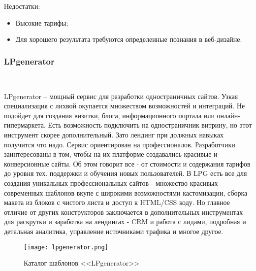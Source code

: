 Недостатки:

\begin{itemize}
	\item Высокие тарифы;
	\item Для хорошего результата требуются определенные познания в веб-дизайне.
\end{itemize}

\subsubsection{LPgenerator}
\

LPgenerator – мощный сервис для разработки одностраничных сайтов. Узкая специализация с лихвой окупается множеством возможностей и интеграций. Не подойдет для создания визитки, блога, информационного портала или онлайн-гипермаркета. Есть возможность подключить на одностраничник витрину, но этот инструмент скорее дополнительный. Зато лендинг при должных навыках получится что надо. 
Сервис ориентирован на профессионалов. Разработчики заинтересованы в том, чтобы на их платформе создавались красивые и конверсионные сайты. Об этом говорит все - от стоимости и содержания тарифов до уровня тех. поддержки и обучения новых пользователей. В LPG есть все для создания уникальных профессиональных сайтов - множество красивых современных шаблонов вкупе с широкими возможностями кастомизации, сборка макета из блоков с чистого листа и доступ к HTML/CSS коду. Но главное отличие от других конструкторов заключается в дополнительных инструментах для раскрутки и заработка на лендингах - CRM и работа с лидами, подробная и детальная аналитика, управление источниками трафика и многое другое.

\begin{figure}
\centering
	\texttt{[image: lpgenerator.png]}
	\caption{Каталог шаблонов <<LPgenerator>>}
	\label{sec:analysis:lpgenerator}
\end{figure}